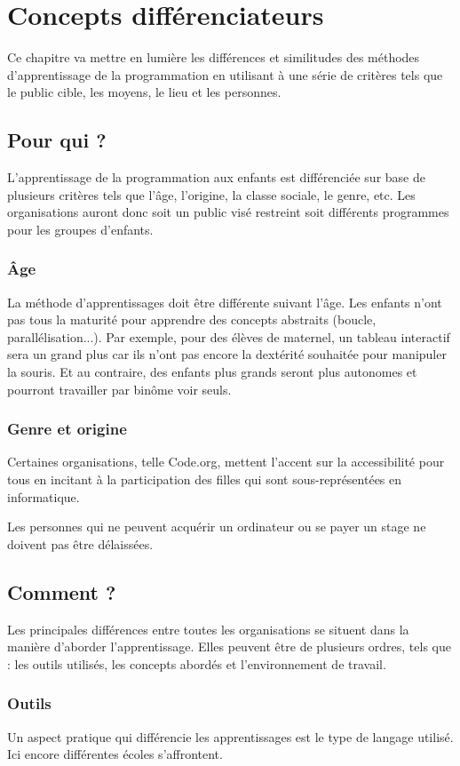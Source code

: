 \section{Concepts différenciateurs}
\label{concepts}
Ce chapitre va mettre en lumière les différences et similitudes des méthodes d'apprentissage de la programmation en utilisant à une série de critères tels que le public cible, les moyens, le lieu et les personnes.
\subsection{Pour qui ?}
L'apprentissage de la programmation aux enfants est différenciée sur base de plusieurs critères tels que l'âge, l'origine, la classe sociale, le genre, etc. Les organisations auront donc soit un public visé restreint soit différents programmes pour les groupes d'enfants.

\subsubsection{Âge}
La méthode d'apprentissages doit être différente suivant l'âge. Les enfants n'ont pas tous la maturité pour apprendre des concepts abstraits (boucle, parallélisation...). Par exemple, pour des élèves de maternel, un tableau interactif sera un grand plus car ils n'ont pas encore la dextérité souhaitée pour manipuler la souris. Et au contraire, des enfants plus grands seront plus autonomes et pourront travailler par binôme voir seuls.

\subsubsection{Genre et origine}
Certaines organisations, telle Code.org, mettent l'accent sur la accessibilité pour tous en incitant à la participation des filles qui sont sous-représentées en informatique.

Les personnes qui ne peuvent acquérir un ordinateur ou se payer un stage ne doivent pas être délaissées.

\subsection{Comment ?}
Les principales différences entre toutes les organisations se situent dans la manière d'aborder l'apprentissage. Elles peuvent être de plusieurs ordres, tels que : les outils utilisés, les concepts abordés et l'environnement de travail.

\subsubsection{Outils}
Un aspect pratique qui différencie les apprentissages est le type de langage utilisé. Ici encore différentes écoles s'affrontent.

